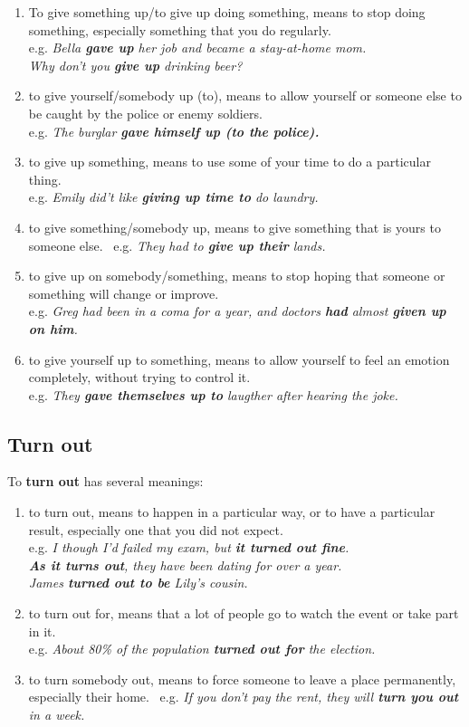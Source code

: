 \documentclass[hidelinks,10pt,a4paper]{article}
\begin{document}
\begin{enumerate}[label=(\alph*)]
	\item To give something up/to give up doing something, means to stop doing something, especially something that you do regularly. \\
		e.g. \textit{Bella \textbf{gave up} her job and became a stay-at-home mom. \\
		Why don't you \textbf{give up} drinking beer?}
	\item to give yourself/somebody up (to), means to allow yourself or someone else to be caught by the police or enemy soldiers. \\
		e.g. \textit{The burglar \textbf{gave himself up (to the police).} }
	\item to give up something, means to use some of your time to do a particular thing. \\
		e.g. \textit{Emily did't like \textbf{giving up time to} do laundry.}
	\item to give something/somebody up, means to give something that is yours to someone else. \
		e.g. \textit{They had to \textbf{give up their} lands.}
	\item to give up on somebody/something, means to stop hoping that someone or something will change or improve. \\
		e.g. \textit{Greg had been in a coma for a year, and doctors \textbf{had} almost \textbf{given up on him}.}
	\item to give yourself up to something, means to allow yourself to feel an emotion completely, without trying to control it. \\
		e.g. \textit{They \textbf{gave themselves up to} laugther after hearing the joke.}
\end{enumerate}

\subsection{Turn out}
To \textbf{turn out} has several meanings:

\begin{enumerate}[label=(\alph*)]
	\item to turn out, means to happen in a particular way, or to have a particular result, especially one that you did not expect. \\
		e.g. \textit{I though I'd failed my exam, but \textbf{it turned out fine}. \\
		\textbf{As it turns out}, they have been dating for over a year.\\
		James \textbf{turned out to be} Lily's cousin. }
	\item to turn out for, means that a lot of people go to watch the event or take part in it. \\
		e.g. \textit{About 80\% of the population \textbf{turned out for} the election.}
	\item to turn somebody out, means to force someone to leave a place permanently, especially their home. \
		e.g. \textit{If you don't pay the rent, they will \textbf{turn you out} in a week. }
\end{enumerate}
\end{document}
